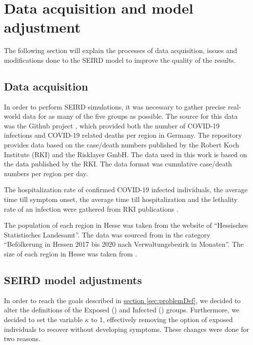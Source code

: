 \section{Data acquisition and model adjustment}
The following section will explain the processes of data acquisition, issues and modifications done to the SEIRD model
to improve the quality of the results.

\subsection{Data acquisition}
\label{sec:datacoll}
In order to perform SEIRD simulations, it was necessary to gather precise real-world data for as many of the five groups as possible.
The source for this data was the Github project \cite{Gehrcke}, which provided both the number of COVID-19 infections
and COVID-19 related deaths per region in Germany. The repository provides data based on the case/death
numbers published by the Robert Koch Institute (RKI) and the Risklayer GmbH. The data used in this work is based on the
data published by the RKI. The data format was cumulative case/death numbers per region per day.\newline

\par
The hospitalization rate of confirmed COVID-19 infected individuals, the average time till symptom onset, the average time till
hospitalization and the lethality rate of an infection were gathered from RKI publications \cite{RKIcov}.\newline 
\par
The population of each region in Hesse was taken from the website of ``Hessisches Statistisches Landesamt''. The data was sourced from
\cite{HessePop} in the category ``Bef\"olkerung in Hessen 2017 bis 2020 nach Verwaltungsbezirk in Monaten''. The size of each region in Hesse
was taken from \cite{HesseSize}.

\subsection{SEIRD model adjustments}
\label{sec:SEIRDredef}
In order to reach the goals described in \hyperref[sec:problemDef]{section \ref*{sec:problemDef}}, we decided to alter
the definitions of the Exposed () and Infected () groups. Furthermore, we decided to set the variable
$\kappa$ to 1, effectively removing the option of exposed individuals to recover without developing symptoms. These
changes were done for two reasons.\newline

